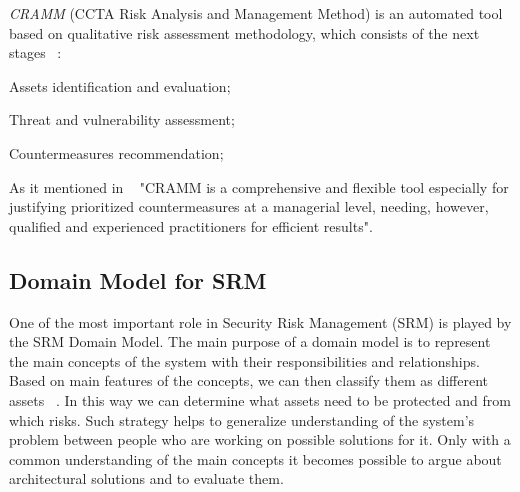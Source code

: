 \documentclass[12pt]{article}
\begin{document}
\textit{CRAMM} (CCTA Risk Analysis and Management Method) is an automated tool based on qualitative risk assessment methodology, which consists of the next stages ~\cite{CRAMM}:
\begin{enumerate*}[label=(\roman*)]
	\item Assets identification and evaluation;
	\item Threat and vulnerability assessment;
	\item Countermeasures recommendation;
\end{enumerate*}
As it mentioned in ~\cite{CRAMM}  "CRAMM is a comprehensive and flexible tool especially for justifying prioritized countermeasures at a managerial level, needing, however, qualified and experienced practitioners for efficient results".



\subsection{Domain Model for SRM}

One of the most important role in Security Risk Management (SRM) is played by the SRM Domain Model. The main purpose of a domain model is to represent the main concepts of the system with their responsibilities and relationships. Based on main features of the concepts, we can then classify  them as different assets ~\cite{IoTRefMod}. In this way we can determine what assets need to be protected and from which risks. Such strategy  helps to generalize understanding of the system's problem between people who are working on possible solutions for it. Only with a common understanding of the main concepts it becomes possible to argue about architectural solutions and to evaluate them.
 
\end{document}
